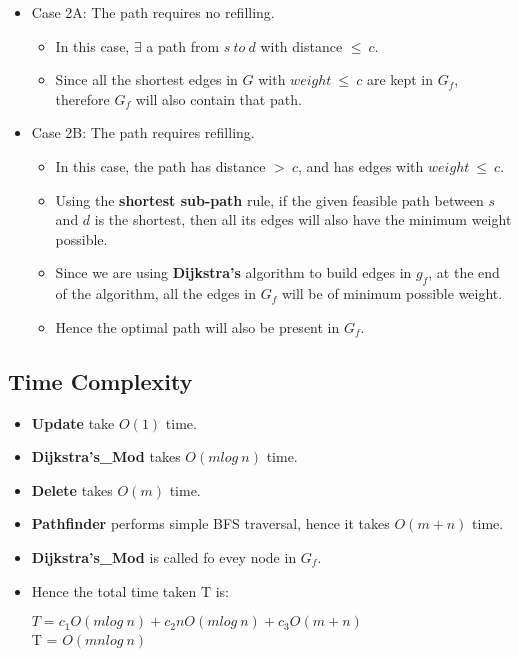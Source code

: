 \documentclass[pdftex,a4paper,12pt]{report}
\begin{document}
\begin{itemize}
    \item Case 2A: The path requires no refilling.
    \begin{itemize}
    \item In this case, $\exists$ a path from $s\ to\ d$ with distance $\leq\ c$.
    \item Since all the shortest edges in $G$ with $weight\ \leq\ c$ are kept in $G_{f}$, therefore $G_{f}$ will also contain that path.
    \end{itemize}
    \item Case 2B: The path requires refilling.
    \begin{itemize}
    \item In this case, the path has distance $>\ c$, and has edges with $weight\ \leq\ c$.
    \item Using the \textbf{shortest sub-path} rule, if the given feasible path between $s$ and $d$ is the shortest, then all its edges will also have the minimum weight possible.
    \item Since we are using \textbf{Dijkstra's} algorithm to build edges in $g_{f}$, at the end of the algorithm, all the edges in $G_{f}$ will be of minimum possible weight.
    \item Hence the optimal path will also be present in $G_{f}$.
    \end{itemize}
\end{itemize}


\subsection{Time Complexity}
\begin{itemize}
\item \textbf{Update} take $O(1)$ time.
\item \textbf{Dijkstra's\_Mod} takes $O(m log\ n)$ time.
\item \textbf{Delete} takes $O(m)$ time.
\item \textbf{Pathfinder} performs simple BFS traversal, hence it takes $O(m+n)$ time.
\item \textbf{Dijkstra's\_Mod} is called fo evey node in $G_{f}$.
\item Hence the total time taken T is:
\begin{center}
$T = c_{1}O(mlog\ n) + c_{2}nO(mlog\ n) + c_{3}O(m+n)$\\
T = $O(mnlog\ n)$
\end{center}

\end{itemize}
\newpage
\end{document}
